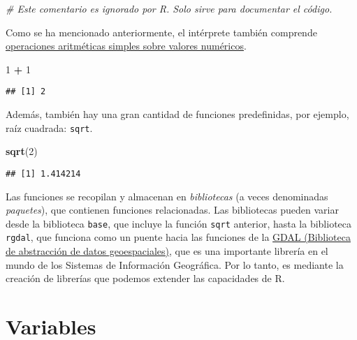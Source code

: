 \documentclass[
]{book}
\newenvironment{Shaded}{\begin{snugshade}}{\end{snugshade}}
\newcommand{\CommentTok}[1]{\textcolor[rgb]{0.56,0.35,0.01}{\textit{#1}}}
\newcommand{\DecValTok}[1]{\textcolor[rgb]{0.00,0.00,0.81}{#1}}
\newcommand{\KeywordTok}[1]{\textcolor[rgb]{0.13,0.29,0.53}{\textbf{#1}}}
\newcommand{\NormalTok}[1]{#1}
\newcommand{\OperatorTok}[1]{\textcolor[rgb]{0.81,0.36,0.00}{\textbf{#1}}}
\newcommand{\StringTok}[1]{\textcolor[rgb]{0.31,0.60,0.02}{#1}}
\begin{document}
\begin{Shaded}
\begin{Highlighting}[]
\CommentTok{# Este comentario es ignorado por R. Solo sirve para documentar el código.}
\end{Highlighting}
\end{Shaded}

Como se ha mencionado anteriormente, el intérprete también comprende \href{https://stat.ethz.ch/R-manual/R-devel/library/base/html/Arithmetic.html}{operaciones aritméticas simples sobre valores numéricos}.

\begin{Shaded}
\begin{Highlighting}[]
\DecValTok{1} \OperatorTok{+}\StringTok{ }\DecValTok{1}
\end{Highlighting}
\end{Shaded}

\begin{verbatim}
## [1] 2
\end{verbatim}

Además, también hay una gran cantidad de funciones predefinidas, por ejemplo, raíz cuadrada: \texttt{sqrt}.

\begin{Shaded}
\begin{Highlighting}[]
\KeywordTok{sqrt}\NormalTok{(}\DecValTok{2}\NormalTok{)}
\end{Highlighting}
\end{Shaded}

\begin{verbatim}
## [1] 1.414214
\end{verbatim}

Las funciones se recopilan y almacenan en \emph{bibliotecas} (a veces denominadas \emph{paquetes}), que contienen funciones relacionadas. Las bibliotecas pueden variar desde la biblioteca \texttt{base}, que incluye la función \texttt{sqrt} anterior, hasta la biblioteca \texttt{rgdal}, que funciona como un puente hacia las funciones de la \href{https://gdal.org/}{GDAL (Biblioteca de abstracción de datos geoespaciales)}, que es una importante librería en el mundo de los Sistemas de Información Geográfica. Por lo tanto, es mediante la creación de librerías que podemos extender las capacidades de R.

\hypertarget{variables}{%
\section{Variables}\label{variables}}
\end{document}
